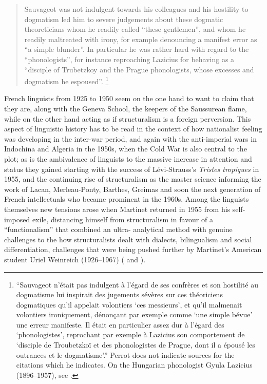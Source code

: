 \documentclass[output=paper]{langscibook}
\begin{document}
\begin{quotation}
Sauvageot was not indulgent towards his colleagues and his hostility to dogmatism led him to severe judgements about these dogmatic theoreticians whom he readily called ``these gentlemen'', and whom he readily maltreated with irony, for example denouncing a manifest error as ``a simple blunder''. In particular he was rather hard with regard to the ``phonologists'', for instance reproaching Lazicius for behaving as a ``disciple of Trubetzkoy and the Prague phonologists, whose excesses and dogmatism he espoused''. \citep[16]{Perrot2009}\footnote{``Sauvageot n'était pas indulgent à l'égard de ses confrères et son hostilité au dogmatisme lui inspirait des jugements sévères sur ces théoriciens dogmatiques qu'il appelait volontiers `ces messieurs', et qu'il malmenait volontiers ironiquement, dénonçant par exemple comme `une simple bévue' une erreur manifeste. Il était en particulier assez dur à l'égard des `phonologistes', reprochant par exemple à Lazicius son comportement de `disciple de Troubetzkoï et des phonologistes de Prague, dont il a épousé les outrances et le dogmatisme'.'' Perrot does not indicate sources for the citations which he indicates. On the Hungarian phonologist Gyula Lazicius (1896--1957), see \citet[288]{Voigt1986}.}
\end{quotation}

French linguists from 1925 to 1950 seem on the one hand to want to claim that they are, along with the Geneva School, the keepers of the Saussurean  flame, while on the other hand acting as if structuralism is a foreign perversion. This aspect of linguistic history has to be read in the context of how nationalist feeling was developing in the inter-war period, and again with the anti-imperial wars in Indochina and Algeria in the 1950s, when the Cold War is also central to the plot; as is the ambivalence of linguists to the massive increase in attention and status they gained starting with the success of Lévi-Strauss's \emph{Tristes tropiques} in 1955, and the continuing rise of structuralism as the master science informing the work of Lacan, Merleau-Ponty, Barthes, Greimas and soon the next generation of French intellectuals who became prominent in the 1960s. Among the linguists themselves new tensions arose when Martinet returned in 1955 from his self-imposed exile, distancing himself from structuralism in favour of a ``functionalism'' that combined an ultra- analytical method with genuine challenges to the how structuralists dealt with dialects, bilingualism and social differentiation, challenges that were being pushed further by Martinet's American student Uriel Weinreich (1926--1967) (\citealt[see, e.g.,][]{Weinreich1954} and \citealt{Joseph2016}).
\end{document}
